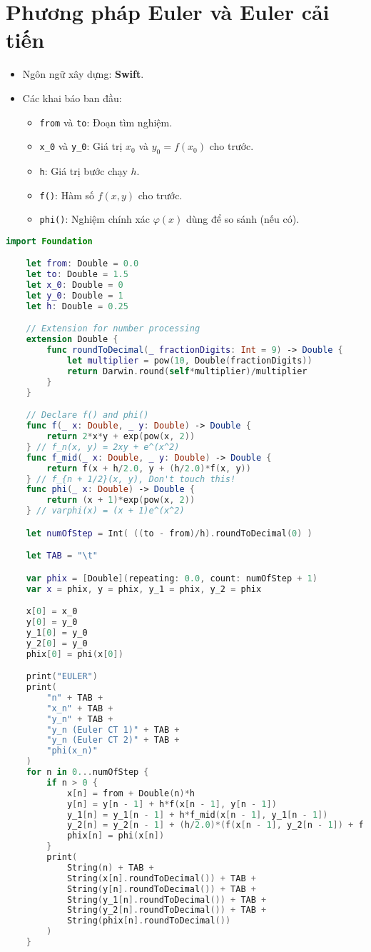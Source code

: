\section{Phương pháp Euler và Euler cải tiến}
\begin{itemize}
	\item Ngôn ngữ xây dựng: \textbf{Swift}.
	\item Các khai báo ban đầu:
	\begin{itemize}
		\item \texttt{from} và \texttt{to}: Đoạn tìm nghiệm.
		\item \texttt{x\_0} và \texttt{y\_0}: Giá trị $x_0$ và $y_0=f(x_0)$ cho trước.
		\item \texttt{h}: Giá trị bước chạy $h$.
		\item \texttt{f()}: Hàm số $f(x, y)$ cho trước.
		\item \texttt{phi()}: Nghiệm chính xác $\varphi(x)$ dùng để so sánh (nếu có).
	\end{itemize}
\end{itemize}

\begin{lstlisting}[language=Swift]
	import Foundation

	let from: Double = 0.0
	let to: Double = 1.5
	let x_0: Double = 0
	let y_0: Double = 1
	let h: Double = 0.25

	// Extension for number processing
	extension Double {
		func roundToDecimal(_ fractionDigits: Int = 9) -> Double {
			let multiplier = pow(10, Double(fractionDigits))
			return Darwin.round(self*multiplier)/multiplier
		}
	}

	// Declare f() and phi()
	func f(_ x: Double, _ y: Double) -> Double {
		return 2*x*y + exp(pow(x, 2))
	} // f_n(x, y) = 2xy + e^(x^2)
	func f_mid(_ x: Double, _ y: Double) -> Double {
		return f(x + h/2.0, y + (h/2.0)*f(x, y))
	} // f_{n + 1/2}(x, y), Don't touch this!
	func phi(_ x: Double) -> Double {
		return (x + 1)*exp(pow(x, 2))
	} // varphi(x) = (x + 1)e^(x^2)

	let numOfStep = Int( ((to - from)/h).roundToDecimal(0) )

	let TAB = "\t"

	var phix = [Double](repeating: 0.0, count: numOfStep + 1)
	var x = phix, y = phix, y_1 = phix, y_2 = phix

	x[0] = x_0
	y[0] = y_0
	y_1[0] = y_0
	y_2[0] = y_0
	phix[0] = phi(x[0])

	print("EULER")
	print(
		"n" + TAB +
		"x_n" + TAB +
		"y_n" + TAB +
		"y_n (Euler CT 1)" + TAB +
		"y_n (Euler CT 2)" + TAB +
		"phi(x_n)"
	)
	for n in 0...numOfStep {
		if n > 0 {
			x[n] = from + Double(n)*h
			y[n] = y[n - 1] + h*f(x[n - 1], y[n - 1])
			y_1[n] = y_1[n - 1] + h*f_mid(x[n - 1], y_1[n - 1])
			y_2[n] = y_2[n - 1] + (h/2.0)*(f(x[n - 1], y_2[n - 1]) + f(x[n], y[n]))
			phix[n] = phi(x[n])
		}
		print(
			String(n) + TAB +
			String(x[n].roundToDecimal()) + TAB +
			String(y[n].roundToDecimal()) + TAB +
			String(y_1[n].roundToDecimal()) + TAB +
			String(y_2[n].roundToDecimal()) + TAB +
			String(phix[n].roundToDecimal())
		)
	}
\end{lstlisting}

